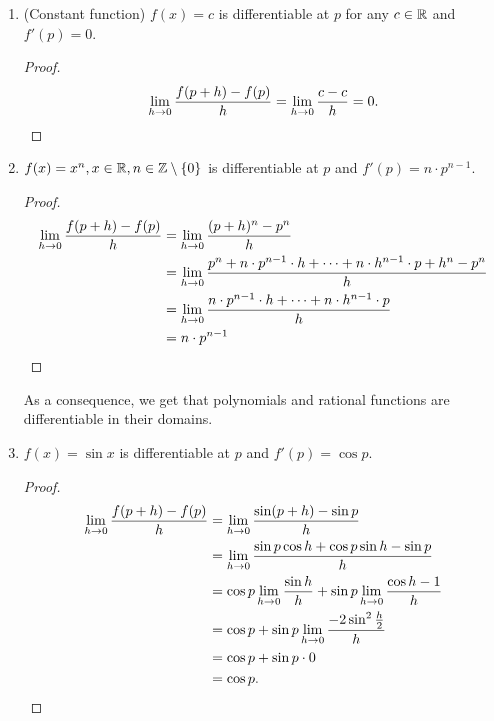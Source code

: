 \begin{example} \leavevmode
    \begin{enumerate}[label=(\alph*)]
        \item (Constant function) $f(x) = c$ is differentiable at $p$ for any $c \in \mathbb{R}$ and $f'(p) = 0$.
        \begin{proof}
        \[
            \lim_{h \to 0} \frac{f(p + h) - f(p)}{h} = \lim_{h \to 0} \frac{c - c}{h} = 0. \qedhere
        \]
        \end{proof}
        \item $f(x) = x^{n}, x \in \R, n \in \Z \setminus \set{0}$ is differentiable at $p$ and $f'(p) = n \cdot p^{n - 1}$.
        \begin{proof}
            \begin{align*}
                \lim_{h \to 0} \frac{f(p + h) - f(p)}{h} &= \lim_{h \to 0} \frac{(p + h)^{n} - p^{n}}{h} \\
                &= \lim_{h \to 0} \frac{p^{n} + n \cdot p^{n - 1} \cdot h + \cdots + n \cdot h^{n - 1} \cdot p + h^{n} - p^{n}}{h} \\
                &= \lim_{h \to 0} \frac{n \cdot p^{n - 1} \cdot h + \cdots + n \cdot h^{n - 1} \cdot p}{h} \\
                &= n \cdot p^{n - 1} \qedhere
            \end{align*}
        \end{proof}
        As a consequence, we get that polynomials and rational functions are differentiable in their domains.

        \item $f(x) = \sin x$ is differentiable at $p$ and $f'(p) = \cos p$.
        \begin{proof}
            \begin{align*}
                \lim_{h \to 0} \frac{f(p + h) - f(p)}{h} &= \lim_{h \to 0} \frac{\sin(p + h) - \sin p}{h} \\
                &= \lim_{h \to 0} \frac{\sin p \cos h + \cos p \sin h - \sin p}{h} \\
                &= \cos p \lim_{h \to 0} \frac{\sin h}{h} + \sin p \lim_{h \to 0} \frac{\cos h - 1}{h} \\
                &= \cos p + \sin p \lim_{h \to 0} \frac{-2 \sin^{2} \frac{h}{2}}{h} \\
                &= \cos p + \sin p \cdot 0 \\
                &= \cos p. \qedhere
            \end{align*}
        \end{proof}


\end{enumerate}
\end{example}
